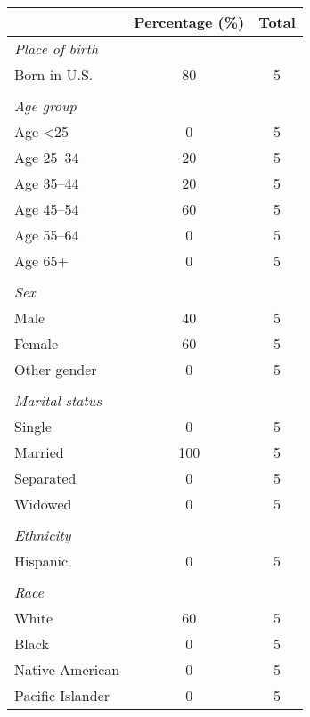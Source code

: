 \begin{tabular}{l*{1}{cc}}
\toprule
                &Percentage (\%)&    Total\\
\midrule
\emph{Place of birth}&         &         \\
Born in U.S.    &       80&        5\\
\vspace{0.1em} \\ \emph{Age group}&         &         \\
Age <25         &        0&        5\\
Age 25–34       &       20&        5\\
Age 35–44       &       20&        5\\
Age 45–54       &       60&        5\\
Age 55–64       &        0&        5\\
Age 65+         &        0&        5\\
\vspace{0.1em} \\ \emph{Sex}&         &         \\
Male            &       40&        5\\
Female          &       60&        5\\
Other gender    &        0&        5\\
\vspace{0.1em} \\ \emph{Marital status}&         &         \\
Single          &        0&        5\\
Married         &      100&        5\\
Separated       &        0&        5\\
Widowed         &        0&        5\\
\vspace{0.1em} \\ \emph{Ethnicity}&         &         \\
Hispanic        &        0&        5\\
\vspace{0.1em} \\ \emph{Race}&         &         \\
White           &       60&        5\\
Black           &        0&        5\\
Native American &        0&        5\\
Pacific Islander&        0&        5\\

\end{tabular}
